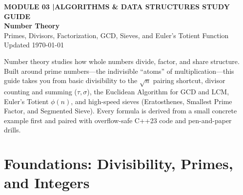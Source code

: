 \documentclass[11pt,a4paper]{article}
\newcommand{\sectionbreak}{}
\theoremstyle{definition}
\begin{document}
\thispagestyle{plain}
\begin{tcolorbox}[
    enhanced,
    colback=primaryblue!6, colframe=primaryblue!20,
    borderline west={5pt}{0pt}{primaryblue},
    arc=4pt, boxrule=0.6pt,
    left=14pt, right=14pt, top=7pt, bottom=7pt,
    before skip=0pt, after skip=5pt
]
    {\footnotesize\bfseries\color{accentteal}MODULE 03 \quad|\quad ALGORITHMS \& DATA STRUCTURES STUDY GUIDE}\\[3pt]
    {\Huge\bfseries\color{primaryblue}Number Theory}\\[3pt]
    {\large\color{codegray}Primes, Divisors, Factorization, GCD, Sieves, and Euler's Totient Function}\\[4pt]
    {\footnotesize\color{codegray}Updated \today}
\end{tcolorbox}

\begin{overviewbox}
{\small Number theory studies how whole numbers divide, factor, and share structure. Built around prime numbers---the indivisible ``atoms'' of multiplication---this guide takes you from basic divisibility to the $\sqrt{n}$ pairing shortcut, divisor counting and summing ($\tau, \sigma$), the Euclidean Algorithm for GCD and LCM, Euler's Totient $\phi(n)$, and high-speed sieves (Eratosthenes, Smallest Prime Factor, and Segmented Sieve). Every formula is derived from a small concrete example first and paired with overflow-safe C++23 code and pen-and-paper drills.}
\end{overviewbox}

\vspace{-6pt}
{\setlength{\parskip}{0pt}\footnotesize
\titlespacing*{\section}{0pt}{2pt}{6pt}%
\makeatletter
\let\lm@orig@addvspace\addvspace
\renewcommand{\addvspace}[1]{\lm@orig@addvspace{0.18em plus 1pt}}
\makeatother
\tableofcontents}

\renewcommand{\sectionbreak}{\clearpage}

\section{Foundations: Divisibility, Primes, and Integers}
\end{document}
